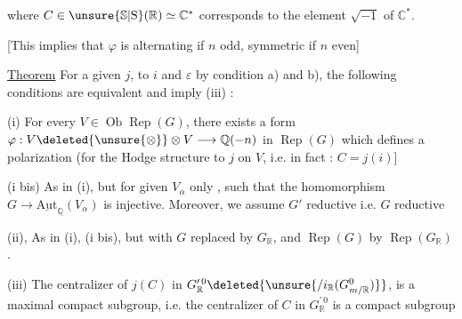 where $C\in\unsure{\mathbb{S}|\mathrm{S}}(\mathbb{R})\simeq\mathbb{C}^{*}$ corresponds to the element $\sqrt{-1}$ of $\mathbb{C}^{*}$.

[This implies that $\varphi$ is alternating if $n$ odd, symmetric if $n$ even]

\uline{Theorem} For a given $j$,  to $i$ and $\varepsilon$ by condition a) and b), the following conditions  are equivalent and imply (iii) :

(i) For every $V\in\operatorname{Ob}\operatorname{Rep}(G)$,  there exists a form $\varphi:V\deleted{\unsure{\otimes}}\otimes V\longrightarrow\mathbb{Q}(-n)$ in $\operatorname{Rep}(G)$ which defines a polarization (for the Hodge structure  to $j$ on $V$, \unsure{$j$|$]$|$\}$} i.e. in fact : $C=j(i)$]

(i bis) As in (i), but  for given $V_{\alpha}$ only ,  such that  the homomorphism $G\longrightarrow\underline{\mathrm{Aut}}_{\mathbb{Q}}(V_{\alpha})$ is injective. Moreover, we assume $G'$ reductive i.e. $G$ reductive

(ii),  As in (i), (i bis), but with $G$ replaced by $G_{\mathbb{R}}$, and $\operatorname{Rep}(G)$ by $\operatorname{Rep}(G_{\mathbb{R}})$.

(iii)  The centralizer of $j(C)$  in $G_{\mathbb{R}}^{\prime\,0}\deleted{\unsure{/i_{\mathbb{R}}(G_{m/\mathbb{R}}^{0})}}$,  is a maximal compact subgroup,  i.e. the centralizer of $C$ in $G_{\mathbb{R}}^{\prime\,0}$ is a compact subgroup 

